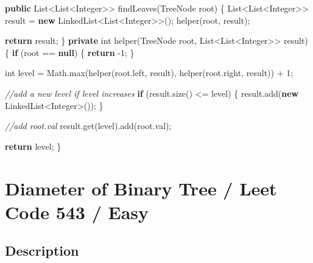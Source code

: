 \documentclass[]{book}
\newenvironment{Shaded}{\begin{snugshade}}{\end{snugshade}}
\newcommand{\BuiltInTok}[1]{#1}
\newcommand{\CommentTok}[1]{\textcolor[rgb]{0.56,0.35,0.01}{\textit{#1}}}
\newcommand{\DataTypeTok}[1]{\textcolor[rgb]{0.13,0.29,0.53}{#1}}
\newcommand{\DecValTok}[1]{\textcolor[rgb]{0.00,0.00,0.81}{#1}}
\newcommand{\FunctionTok}[1]{\textcolor[rgb]{0.00,0.00,0.00}{#1}}
\newcommand{\KeywordTok}[1]{\textcolor[rgb]{0.13,0.29,0.53}{\textbf{#1}}}
\newcommand{\NormalTok}[1]{#1}
\begin{document}
\begin{Shaded}
\begin{Highlighting}[]
\KeywordTok{public} \BuiltInTok{List}\NormalTok{<}\BuiltInTok{List}\NormalTok{<}\BuiltInTok{Integer}\NormalTok{>> }\FunctionTok{findLeaves}\NormalTok{(}\BuiltInTok{TreeNode}\NormalTok{ root) \{}
    \BuiltInTok{List}\NormalTok{<}\BuiltInTok{List}\NormalTok{<}\BuiltInTok{Integer}\NormalTok{>> result = }\KeywordTok{new} \BuiltInTok{LinkedList}\NormalTok{<}\BuiltInTok{List}\NormalTok{<}\BuiltInTok{Integer}\NormalTok{>>();}
    \FunctionTok{helper}\NormalTok{(root, result);}

    \KeywordTok{return}\NormalTok{ result;}
\NormalTok{\}}
\KeywordTok{private} \DataTypeTok{int} \FunctionTok{helper}\NormalTok{(}\BuiltInTok{TreeNode}\NormalTok{ root, }\BuiltInTok{List}\NormalTok{<}\BuiltInTok{List}\NormalTok{<}\BuiltInTok{Integer}\NormalTok{>> result) \{}
    \KeywordTok{if}\NormalTok{ (root == }\KeywordTok{null}\NormalTok{) \{}
        \KeywordTok{return} \DecValTok{-1}\NormalTok{;}
\NormalTok{    \}}

    \DataTypeTok{int}\NormalTok{ level = }\BuiltInTok{Math}\NormalTok{.}\FunctionTok{max}\NormalTok{(}\FunctionTok{helper}\NormalTok{(root.}\FunctionTok{left}\NormalTok{, result), }\FunctionTok{helper}\NormalTok{(root.}\FunctionTok{right}\NormalTok{, result)) + }\DecValTok{1}\NormalTok{;}

    \CommentTok{//add a new level if level increases}
    \KeywordTok{if}\NormalTok{ (result.}\FunctionTok{size}\NormalTok{() <= level) \{}
\NormalTok{        result.}\FunctionTok{add}\NormalTok{(}\KeywordTok{new} \BuiltInTok{LinkedList}\NormalTok{<}\BuiltInTok{Integer}\NormalTok{>());}
\NormalTok{    \}}

    \CommentTok{//add root.val}
\NormalTok{    result.}\FunctionTok{get}\NormalTok{(level).}\FunctionTok{add}\NormalTok{(root.}\FunctionTok{val}\NormalTok{);}

    \KeywordTok{return}\NormalTok{ level;}
\NormalTok{\}}
\end{Highlighting}
\end{Shaded}

\hypertarget{diameter-of-binary-tree-leet-code-543-easy}{%
\section{Diameter of Binary Tree / Leet Code 543 / Easy}\label{diameter-of-binary-tree-leet-code-543-easy}}

\hypertarget{description-73}{%
\subsection{Description}\label{description-73}}
\end{document}
